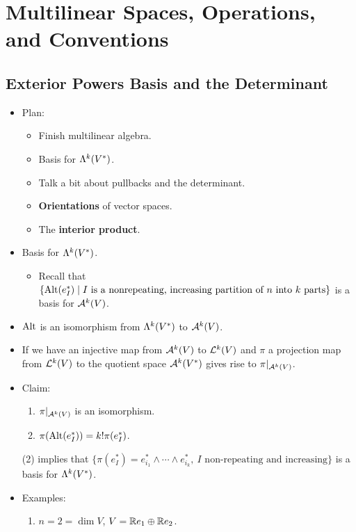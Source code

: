 \documentclass[../notes.tex]{subfiles}
\begin{document}
\chapter{Multilinear Spaces, Operations, and Conventions}
\section{Exterior Powers Basis and the Determinant}
\begin{itemize}
    \item {}Plan:
    \begin{itemize}
        \item Finish multilinear algebra.
        \item Basis for $\lam[k]{V^*}$.
        \item Talk a bit about pullbacks and the determinant.
        \item \textbf{Orientations} of vector spaces.
        \item The \textbf{interior product}.
    \end{itemize}
    \item Basis for $\lam[k]{V^*}$.
    \begin{itemize}
        \item Recall that $\{\Alt(e_I^*)\mid I\text{ is a nonrepeating, increasing partition of $n$ into $k$ parts}\}$ is a basis for $\alt[k]{V}$.
    \end{itemize}
    \item $\Alt$ is an isomorphism from $\lam[k]{V^*}$ to $\alt[k]{V}$.
    \item If we have an injective map from $\alt[k]{V}$ to $\lin[k]{V}$ and $\pi$ a projection map from $\lin[k]{V}$ to the quotient space $\alt[k]{V^*}$ gives rise to $\pi|_{\alt[k]{V}}$.
    \item Claim:
    \begin{enumerate}
        \item $\pi|_{\alt[k]{V}}$ is an isomorphism.
        \item $\pi(\Alt(e_I^*))=k!\pi(e_I^*)$.
    \end{enumerate}
    (2) implies that $\{\pi(e_I^*)=e_{i_1}^*\wedge\cdots\wedge e_{i_k}^*,\ I\text{ non-repeating and increasing}\}$ is a basis for $\lam[k]{V^*}$.
    \item Examples:
    \begin{enumerate}
        \item $n=2=\dim V$, $V=\R e_1\oplus\R e_2$.
        \begin{itemize}

\end{itemize}
\end{enumerate}
\end{itemize}
\end{document}
